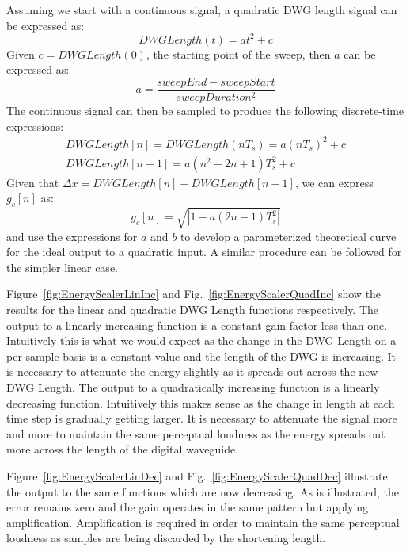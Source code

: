 \documentclass[../main.tex]{subfiles}
\begin{document}
Assuming we start with a continuous signal, a quadratic DWG length signal can be expressed as:
\begin{equation}
    DWGLength(t) = at^2 + c 
\end{equation}
Given $c = DWGLength(0)$,  the starting point of the sweep, then $a$ can be expressed as:
\begin{equation}
    a = \frac{sweepEnd - sweepStart}{sweepDuration^2}
\end{equation}
The continuous signal can then be sampled to produce the following discrete-time expressions:
\begin{align}
    DWGLength[n] = DWGLength(nT_s) = a(nT_s)^2 + c\\
    DWGLength[n-1] = a(n^2 - 2n + 1)T_s^2 + c
\end{align}
Given that $\Delta x = DWGLength[n] - DWGLength[n-1]$, we can express $g_c[n]$ as:
\begin{equation}
    g_c[n] = \sqrt{|1-a(2n-1)T_s^2|}
\end{equation}
and use the expressions for $a$ and $b$ to develop a parameterized theoretical curve for the ideal output to a quadratic input. A similar procedure can be followed for the simpler linear case.

Figure~\ref{fig:EnergyScalerLinInc} and Fig.~\ref{fig:EnergyScalerQuadInc} show the results for the linear and quadratic DWG Length functions respectively. The output to a linearly increasing function is a constant gain factor less than one. Intuitively this is what we would expect as the change in the DWG Length on a per sample basis is a constant value and the length of the DWG is increasing. It is necessary to attenuate the energy slightly as it spreads out across the new DWG Length. The output to a quadratically increasing function is a linearly decreasing function. Intuitively this makes sense as the change in length at each time step is gradually getting larger. It is necessary to attenuate the signal more and more to maintain the same perceptual loudness as the energy spreads out more across the length of the digital waveguide. 

Figure~\ref{fig:EnergyScalerLinDec} and Fig.~\ref{fig:EnergyScalerQuadDec} illustrate the output to the same functions which are now decreasing. As is illustrated, the error remains zero and the gain operates in the same pattern but applying amplification. Amplification is required in order to maintain the same perceptual loudness as samples are being discarded by the shortening length.
\end{document}
